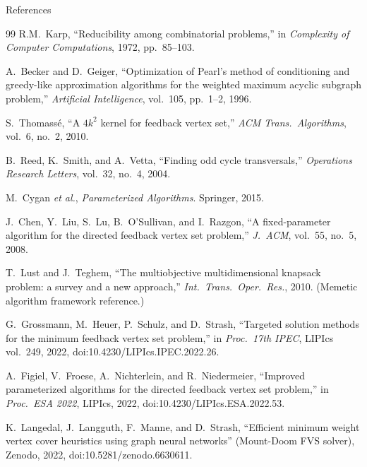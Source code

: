 \documentclass[aspectratio=169]{beamer}
\renewcommand{\footnotesize}{\tiny}
\begin{document}
\begin{frame}[allowframebreaks]{References}
	\begin{thebibliography}{99}
		\scriptsize
		R.M.~Karp,
		``Reducibility among combinatorial problems,''
		in \emph{Complexity of Computer Computations}, 1972, pp.~85--103.

		A.~Becker and D.~Geiger,
		``Optimization of Pearl's method of conditioning and greedy-like approximation
		algorithms for the weighted maximum acyclic subgraph problem,''
		\emph{Artificial Intelligence}, vol.~105, pp.~1--2, 1996.

		S.~Thomassé,
		``A $4k^2$ kernel for feedback vertex set,''
		\emph{ACM Trans.\ Algorithms}, vol.~6, no.~2, 2010.

		B.~Reed, K.~Smith, and A.~Vetta,
		``Finding odd cycle transversals,''
		\emph{Operations Research Letters}, vol.~32, no.~4, 2004.

		M.~Cygan \emph{et al.},
		\emph{Parameterized Algorithms}.
		Springer, 2015.

		J.~Chen, Y.~Liu, S.~Lu, B.~O'Sullivan, and I.~Razgon,
		``A fixed-parameter algorithm for the directed feedback vertex set problem,''
		\emph{J.~ACM}, vol.~55, no.~5, 2008.

		T.~Lust and J.~Teghem,
		``The multiobjective multidimensional knapsack problem: a survey and a new approach,''
		\emph{Int.\ Trans.\ Oper.\ Res.}, 2010.
			{\footnotesize(Memetic algorithm framework reference.)}

		G.~Grossmann, M.~Heuer, P.~Schulz, and D.~Strash,
		``Targeted solution methods for the minimum feedback vertex set problem,''
		in \emph{Proc.\ 17th IPEC}, LIPIcs vol.~249, 2022,
		doi:10.4230/LIPIcs.IPEC.2022.26.

		A.~Figiel, V.~Froese, A.~Nichterlein, and R.~Niedermeier,
		``Improved parameterized algorithms for the directed feedback vertex set problem,''
		in \emph{Proc.\ ESA 2022}, LIPIcs, 2022,
		doi:10.4230/LIPIcs.ESA.2022.53.

		K.~Langedal, J.~Langguth, F.~Manne, and D.~Strash,
		``Efficient minimum weight vertex cover heuristics using graph neural networks'' (Mount-Doom FVS solver),
		Zenodo, 2022, doi:10.5281/zenodo.6630611.


\end{thebibliography}
\end{frame}
\end{document}
